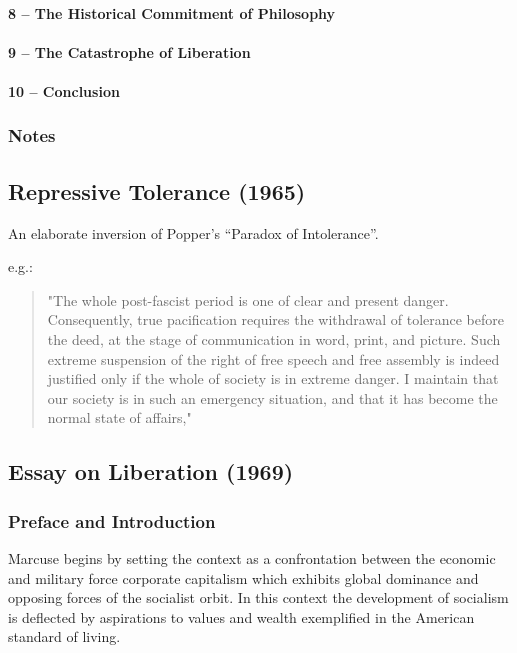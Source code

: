 \documentclass[10pt,titlepage]{book}
\begin{document}
\paragraph{8 – The Historical Commitment of Philosophy}
\paragraph{9 – The Catastrophe of Liberation}
\paragraph{10 – Conclusion}
\subsubsection{Notes}


\subsection{Repressive Tolerance (1965)\cite{marcuse-repressive}}

An elaborate inversion of Popper's ``Paradox of Intolerance''.

e.g.:

\begin{quotation}
"The whole post-fascist period is one of clear and present danger. Consequently, true pacification requires the withdrawal of tolerance before the deed, at the stage of communication in word, print, and picture. Such extreme suspension of the right of free speech and free assembly is indeed justified only if the whole of society is in extreme danger. I maintain that our society is in such an emergency situation, and that it has become the normal state of affairs,"
\end{quotation}

  
\subsection{Essay on Liberation (1969)\cite{marcuse-liberation}}

\subsubsection{Preface and Introduction}

Marcuse begins by setting the context as a confrontation between the economic and military force corporate capitalism which exhibits global dominance and opposing forces of the socialist orbit.
In this context the development of socialism is deflected by aspirations to values and wealth exemplified in the American standard of living.
\end{document}
